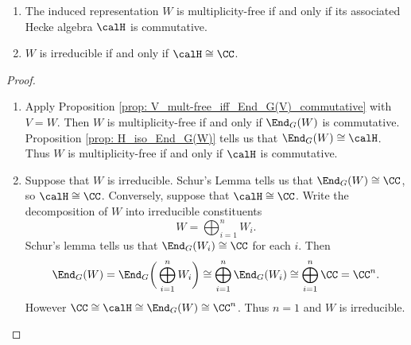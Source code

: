 \begin{cor}\label{cor: H_commutative}
	\begin{enumerate}[\itshape(i)]
		\item The induced representation $W$ is multiplicity-free if and only if its associated Hecke algebra $\calH$ is commutative.
		\item $W$ is irreducible if and only if $\calH \cong \CC$.
	\end{enumerate}
\end{cor}
\begin{proof}
	\begin{enumerate}[\itshape(i)]
		\item Apply Proposition \ref{prop: V_mult-free_iff_End_G(V)_commutative} with $V=W$.
		      Then $W$ is multiplicity-free if and only if $\End_G(W)$ is commutative.
		      Proposition \ref{prop: H_iso_End_G(W)} tells us that $\End_G(W)\cong\calH$.
		      Thus $W$ is multiplicity-free if and only if $\calH$ is commutative.

		\item Suppose that $W$ is irreducible.
		      Schur's Lemma tells us that $\End_G(W)\cong\CC$, so $\calH\cong\CC$.
		      Conversely, suppose that $\calH\cong\CC$.
		      Write the decomposition of $W$ into irreducible constituents
		      \[
			      W = \bigoplus_{i=1}^n W_i.
		      \]
		      Schur's lemma tells us that $\End_G(W_i)\cong \CC$ for each $i$.
		      Then
		      \[
			      \End_G(W) = \End_G\bigg(\bigoplus_{i=1}^n W_i\bigg) \cong \bigoplus_{i=1}^n \End_G(W_i) \cong \bigoplus_{i=1}^n \CC = \CC^n.
		      \]
		      However $\CC\cong\calH\cong\End_G(W)\cong\CC^n$.
		      Thus $n=1$ and $W$ is irreducible. \qedhere
	\end{enumerate}
\end{proof}


